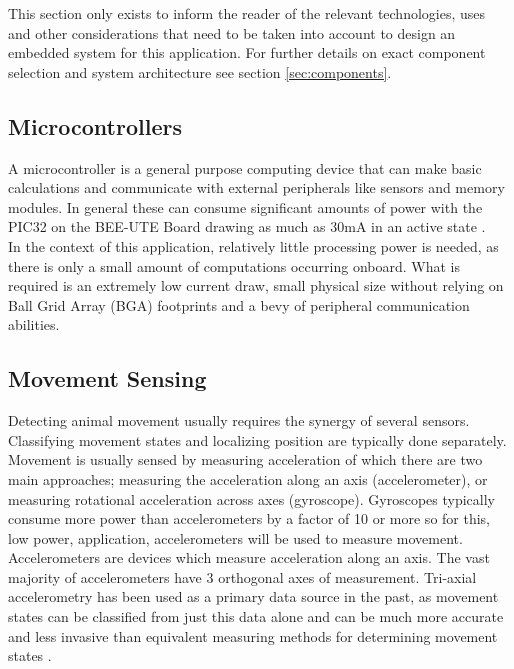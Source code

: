 \documentclass[12pt,openany,a4paper]{book}
\begin{document}
		 This section only exists to inform the reader of the relevant technologies, uses and other considerations that need to be taken into account to design an embedded system for this application. For further details on exact component selection and system architecture see section \ref{sec:components}. 
		\subsection{Microcontrollers}
		A microcontroller is a general purpose computing device that can make basic calculations and communicate with external peripherals like sensors and memory modules. In general these can consume significant amounts of power with the PIC32 on the BEE-UTE Board \cite{Freakley13} drawing as much as 30mA in an active state \cite{PIC32}. \\
		
		In the context of this application, relatively little processing power is needed, as there is only a small amount of computations occurring onboard. What is required is an extremely low current draw, small physical size without relying on Ball Grid Array (BGA) footprints and a bevy of peripheral communication abilities. 
		\subsection{Movement Sensing}
			Detecting animal movement usually requires the synergy of several sensors. Classifying movement states and localizing position are typically done separately. Movement is usually sensed by measuring acceleration of which there are two main approaches; measuring the acceleration along an axis (accelerometer), or measuring rotational acceleration across axes (gyroscope). Gyroscopes typically consume more power than accelerometers by a factor of 10 or more \cite{InvenMPU9150} so for this, low power, application, accelerometers will be used to measure movement. \\
			
			Accelerometers are devices which measure acceleration along an axis. The vast majority of accelerometers have 3 orthogonal axes of measurement. Tri-axial accelerometry has been used as a primary data source in the past, as movement states can be classified from just this data alone \cite{Ran12, Shepard08} and can be much more accurate and less invasive than equivalent measuring methods for determining movement states \cite{Terrill13, Lamprecht14}. 
\end{document}
